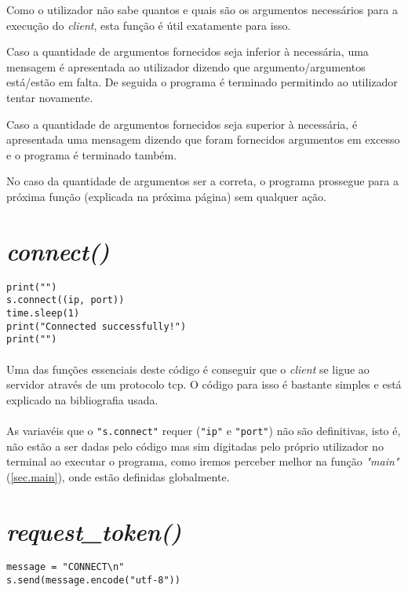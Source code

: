 \documentclass[a4paper]{report}
\begin{document}
Como o utilizador não sabe quantos e quais são os argumentos necessários para a execução do \textit{client}, esta função é útil exatamente para isso.

Caso a quantidade de argumentos fornecidos seja inferior à necessária, uma mensagem é apresentada ao utilizador dizendo que argumento/argumentos está/estão em falta. De seguida o programa é terminado permitindo ao utilizador tentar novamente. 

Caso a quantidade de argumentos fornecidos seja superior à necessária, é apresentada uma mensagem dizendo que foram fornecidos argumentos em excesso e o programa é terminado também.

No caso da quantidade de argumentos ser a correta, o programa prossegue para a próxima função (explicada na próxima página) sem qualquer ação.

\newpage

\section{\textit{connect()}}
\begin{lstlisting}
print("")
s.connect((ip, port))
time.sleep(1)
print("Connected successfully!")
print("")
\end{lstlisting}
\paragraph{}Uma das funções essenciais deste código é conseguir que o \textit{client} se ligue ao servidor através de um protocolo \ac{tcp}. O código para isso é bastante simples e está explicado na bibliografia usada.\cite{tcp}

\paragraph{}As variavéis que o \texttt{"s.connect"} requer (\texttt{"ip"} e \texttt{"port"}) não são definitivas, isto é, não estão a ser dadas pelo código mas sim digitadas pelo próprio utilizador no terminal ao executar o programa, como iremos perceber melhor na função \textit{"main"} (\autoref{sec.main}), onde estão definidas globalmente.

\newpage

\section{\textit{request\_token()}}
\begin{lstlisting}
message = "CONNECT\n"
s.send(message.encode("utf-8"))
\end{lstlisting}
\end{document}
